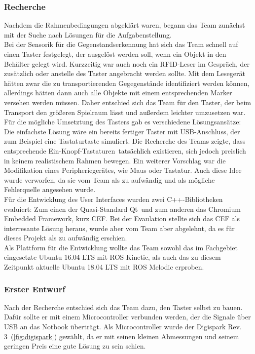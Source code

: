 \documentclass[a4paper,12pt,headsepline]{scrartcl}
\begin{document}
	\subsubsection{Recherche}
		Nachdem die Rahmenbedingungen abgeklärt waren, begann das Team zunächst mit der Suche nach Lösungen für die Aufgabenstellung.\\
		Bei der Sensorik für die Gegenstandserkennung hat sich das Team schnell auf einen Taster festgelegt, der ausgelöst werden soll, wenn ein Objekt in den Behälter gelegt wird. Kurzzeitig war auch noch ein RFID-Leser im Gespräch, der zusätzlich oder anstelle des Taster angebracht werden sollte. Mit dem Lesegerät hätten zwar die zu transportierenden Gegegenstände identifiziert werden können, allerdings hätten dann auch alle Objekte mit einem entsprechenden Marker versehen werden müssen. Daher entschied sich das Team für den Taster, der beim Transport den größeren Spielraum lässt und außerdem leichter umzusetzen war. \\
		Für die mögliche Umsetztung des Tasters gab es verschiedene Lösungsansätze: Die einfachste Lösung wäre ein bereits fertiger Taster mit USB-Anschluss, der zum Beispiel eine Tastaturtaste simuliert. Die Recherche des Teams zeigte, dass entsprechende \glqq Ein-Knopf-Tastaturen\grqq\ tatsächlich existieren, sich jedoch preislich in keinem realistischem Rahmen bewegen. Ein weiterer Vorschlag war die Modifikation eines Peripheriegerätes, wie Maus oder Tastatur. Auch diese Idee wurde verworfen, da sie vom Team als zu aufwändig und als mögliche Fehlerquelle angesehen wurde. \\
		Für die Entwicklung des User Interfaces wurden zwei C++-Bibliotheken evaluiert: Zum einen der Quasi-Standard \glqq Qt\grqq\ und zum anderen das \glqq Chromium Embedded Framework\grqq , kurz CEF. Bei der Evaulation stellte sich das CEF als interresante Lösung heraus, wurde aber vom Team aber abgelehnt, da es für dieses Projekt als zu aufwändig erschien. \\
		Als Plattform für die Entwicklung wollte das Team sowohl das im Fachgebiet eingesetzte Ubuntu 16.04 LTS mit ROS Kinetic, als auch das zu diesem Zeitpunkt aktuelle Ubuntu 18.04 LTS mit ROS Melodic erproben.

	\subsubsection{Erster Entwurf}	
		Nach der Recherche entschied sich das Team dazu, den Taster selbst zu bauen. Dafür sollte er mit einem Microcontroller verbunden werden, der die Signale über USB an das Notbook überträgt. Als Microcontroller wurde der \glqq Digispark Rev. 3\grqq\ (\cref{fig:digispark}) gewählt, da er mit seinen kleinen Abmessungen und seinem geringen Preis eine gute Lösung zu sein schien. 
\end{document}
